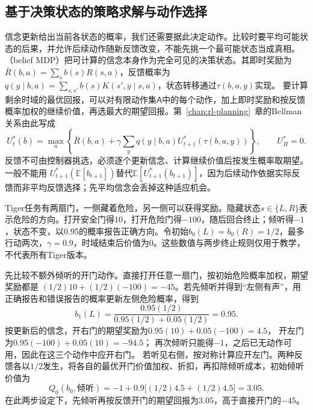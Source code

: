 \subsection{基于决策状态的策略求解与动作选择}
\label{sec:rl-information-belief-control}

信念更新给出当前各状态的概率，我们还需要据此决定动作。比较时要平均可能状态的后果，并允许后续动作随新反馈改变，不能先挑一个最可能状态当成真相。（belief MDP）把可计算的信念本身作为完全可见的决策状态。其即时奖励为
$\bar R(b,a)=\sum_s b(s)R(s,a)$，反馈概率为
$q(y\mid b,a)=\sum_{s,s'}b(s)K(s',y\mid s,a)$，状态转移通过$\tau(b,a,y)$实现。
要计算剩余时域的最优回报，可以对有限动作集$\mathsf A$中的每个动作，加上即时奖励和按反馈概率加权的继续价值，再选最大的期望回报。第~\ref{chap:rl-planning}~章的Bellman关系由此写成
\begin{equation}
  \label{eq:rl-information-belief-bellman}
  U_t^*(b)=\max_a\left\{
    \bar R(b,a)+\gamma\sum_yq(y\mid b,a)
                    U_{t+1}^*(\tau(b,a,y))\right\},
  \qquad U_H^*=0.
\end{equation}
反馈不可由控制器挑选，必须逐个更新信念、计算继续价值后按发生概率取期望。一般不能用
$U_{t+1}^*(\mathbb E[b_{t+1}])$替代$\mathbb E[U_{t+1}^*(b_{t+1})]$，因为后续动作依据实际反馈而非平均反馈选择；先平均信念会丢掉这种适应机会。

\begin{example}
  \label{ex:rl-information-tiger}
  Tiger任务有两扇门，一侧藏着危险，另一侧可以获得奖励。隐藏状态$s\in\{L,R\}$表示危险的方向。打开安全门得10，打开危险门得$-100$，随后回合终止；倾听得$-1$，状态不变，以0.95的概率报告正确方向。令初始$b_0(L)=b_0(R)=1/2$，最多行动两次，$\gamma=0.9$，时域结束后价值为0。这些数值与两步终止规则仅用于教学，不代表所有Tiger版本。

  先比较不额外倾听的开门动作。直接打开任意一扇门，按初始危险概率加权，期望奖励都是
  $(1/2)10+(1/2)(-100)=-45$。若先倾听并得到“左侧有声”，用正确报告和错误报告的概率更新左侧危险概率，得到
  \[
    b_1(L)=\frac{0.95(1/2)}
                        {0.95(1/2)+0.05(1/2)}=0.95.
  \]
  按更新后的信念，开右门的期望奖励为$0.95(10)+0.05(-100)=4.5$，
  开左门为$0.95(-100)+0.05(10)=-94.5$；
  再次倾听只能得$-1$，之后已无动作可用，因此在这三个动作中应开右门。
  若听见右侧，按对称计算应开左门。两种反馈各以$1/2$发生，将各自的最优开门价值加权、折扣，再扣除倾听成本，初始倾听价值为
  \[
    Q_0(b_0,\text{倾听})
       =-1+0.9\bigl[(1/2)4.5+(1/2)4.5\bigr]=3.05.
  \]
  在此两步设定下，先倾听再按反馈开门的期望回报为3.05，高于直接开门的$-45$。
\end{example}

